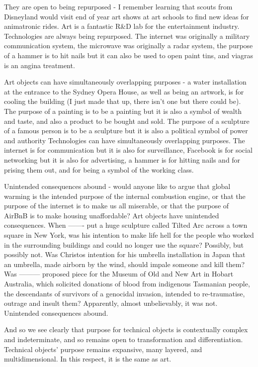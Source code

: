 \documentclass[letterpaper]{article}
\begin{document}
    They are open to being repurposed - I remember learning that scouts from Disneyland would visit end of year art shows at art schools to find new ideas for animatronic rides. Art is a fantastic R\&D lab for the entertainment industry.
    Technologies are always being repurposed. The internet was originally a military communication system, the microwave was originally a radar system, the purpose of a hammer is to hit nails but it can also be used to open paint tins, and viagras is an angina treatment.

    Art objects can have simultaneously overlapping purposes - a water installation at the entrance to the Sydney Opera House, as well as being an artwork, is for cooling the building (I just made that up, there isn't one but there could be). The purpose of a painting is to be a painting but it is also a symbol of wealth and taste, and also a product to be bought and sold. The purpose of a sculpture of a famous person is to be a sculpture but it is also a political symbol of power and authority
    Technologies can have simultaneously overlapping purposes. The internet is for communication but it is also for surveillance, Facebook is for social networking but it is also for advertising, a hammer is for hitting nails and for prising them out, and for being a symbol of the working class.

    Unintended consequences abound - would anyone like to argue that global warming is the intended purpose of the internal combustion engine, or that the purpose of the internet is to make us all miserable, or that the purpose of AirBnB is to make housing unaffordable?
    Art objects have unintended consequences. When ------- put a huge sculpture called Tilted Arc across a town square in New York, was his intention to make life hell for the people who worked in the surrounding buildings and could no longer use the square? Possibly, but possibly not. Was Christos intention for his umbrella installation in Japan that an umbrella, made airborn by the wind, should impale someone and kill them? Was --------- proposed piece for the Museum of Old and New Art in Hobart Australia, which solicited donations of blood from indigenous Tasmanian people, the descendants of survivors of a genocidal invasion, intended to re-traumatise, outrage and insult them? Apparently, almost unbelievably, it was not. Unintended consequences abound.

    And so we see clearly that purpose for technical objects is contextually complex and indeterminate, and so remains open to transformation and differentiation. Technical objects' purpose remains expansive, many layered, and multidimensional. In this respect, it is the same as art.
\end{document}
